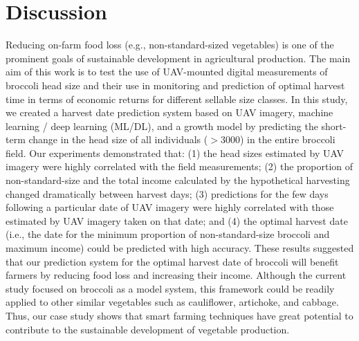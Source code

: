 


\section{Discussion}

Reducing on-farm food loss (e.g., non-standard-sized vegetables) is one of the prominent goals of sustainable development in agricultural production. The main aim of this work is to test the use of UAV-mounted digital measurements of broccoli head size and their use in monitoring and prediction of optimal harvest time in terms of economic returns for different sellable size classes. In this study, we created a harvest date prediction system based on UAV imagery, machine learning / deep learning (ML/DL), and a growth model by predicting the short-term change in the head size of all individuals ($> 3000$) in the entire broccoli field. Our experiments demonstrated that: (1) the head sizes estimated by UAV imagery were highly correlated with the field measurements; (2) the proportion of non-standard-size and the total income calculated by the hypothetical harvesting changed dramatically between harvest days; (3) predictions for the few days following a particular date of UAV imagery were highly correlated with those estimated by UAV imagery taken on that date; and (4) the optimal harvest date (i.e., the date for the minimum proportion of non-standard-size broccoli and maximum income) could be predicted with high accuracy. These results suggested that our prediction system for the optimal harvest date of broccoli will benefit farmers by reducing food loss and increasing their income. Although the current study focused on broccoli as a model system, this framework could be readily applied to other similar vegetables such as cauliflower, artichoke, and cabbage. Thus, our case study shows that smart farming techniques have great potential to contribute to the sustainable development of vegetable production.

